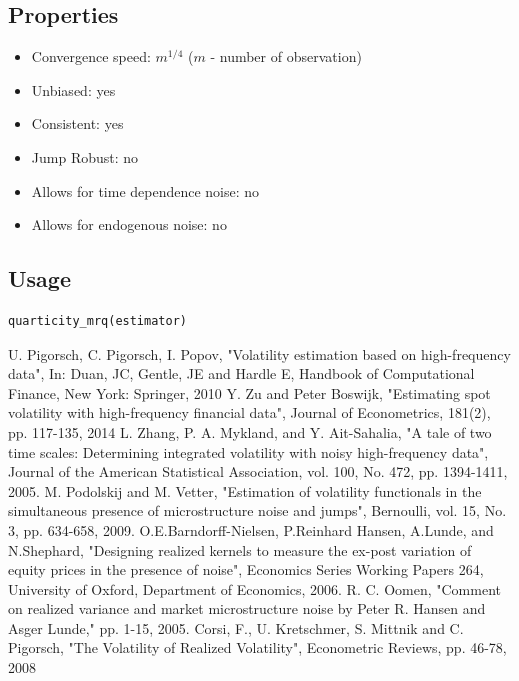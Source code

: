\documentclass[letterpaper]{report}
\newcounter{N}
\begin{document}
\subsection{Properties}
\begin{itemize}
\item Convergence speed: $m^{1/4}$ ($m$ - number of observation)
\item Unbiased: yes
\item Consistent: yes
\item Jump Robust: no
\item Allows for time dependence noise: no
\item Allows for endogenous noise: no
\end{itemize}
  \subsection{Usage}
\begin{lstlisting}
quarticity_mrq(estimator)
\end{lstlisting}

\begin{thebibliography}{100}
U. Pigorsch, C. Pigorsch, I. Popov, "Volatility estimation based on high-frequency data", In: Duan, JC, Gentle, JE and Hardle E, Handbook of Computational Finance, New York: Springer, 2010
Y. Zu and Peter Boswijk, "Estimating spot volatility with high-frequency financial data", Journal of Econometrics, 181(2), pp. 117-135, 2014
L. Zhang, P. A. Mykland, and Y. Ait-Sahalia, "A tale of two time scales: Determining integrated volatility with noisy high-frequency data", Journal of the American Statistical Association, vol. 100, No. 472, pp. 1394-1411, 2005.
M. Podolskij and M. Vetter, "Estimation of volatility functionals in the simultaneous presence of microstructure noise and jumps", Bernoulli, vol. 15, No. 3, pp. 634-658, 2009.
O.E.Barndorff-Nielsen, P.Reinhard Hansen, A.Lunde, and N.Shephard, "Designing realized kernels to measure the ex-post variation of equity prices in the presence of noise", Economics Series Working Papers 264, University of Oxford, Department of Economics, 2006.
R. C. Oomen, "Comment on realized variance and market microstructure noise by Peter R. Hansen and Asger Lunde," pp. 1-15, 2005.
 Corsi, F., U. Kretschmer, S. Mittnik and C. Pigorsch, "The Volatility of Realized Volatility", Econometric Reviews, pp. 46-78, 2008
\end{thebibliography} 
 
\end{document}
